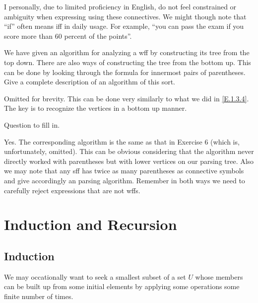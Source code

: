 I personally, due to limited proficiency in English, do not feel constrained or ambiguity when expressing using these connectives. We might though note that ``if'' often means iff in daily usage. For example, ``you can pass the exam if you score more than 60 percent of the points''.

\begin{exercise}
  We have given an algorithm for analyzing a wff by constructing its tree from the top down. There are also ways of constructing the tree from the bottom up. This can be done by looking through the formula for innermost pairs of parentheses. Give a complete description of an algorithm of this sort.
\end{exercise}

Omitted for brevity. This can be done very similarly to what we did in \ref{E.1.3.4}. The key is to recognize the vertices in a bottom up manner.

\begin{exercise}
  Question to fill in.
\end{exercise}

Yes. The corresponding algorithm is the same as that in Exercise 6 (which is, unfortunately, omitted). This can be obvious considering that the algorithm never directly worked with parentheses but with lower vertices on our parsing tree. Also we may note that any sff has twice as many parentheses as connective symbols and give accordingly an parsing algorithm. Remember in both ways we need to carefully reject expressions that are not wffs.

\section{Induction and Recursion}

\subsection*{Induction}

We may occationally want to seek a smallest subset of a set $U$ whose members can be built up from some initial elements by applying some operations some finite number of times.

